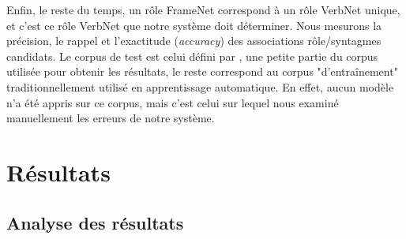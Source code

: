 Enfin, le reste du temps, un rôle FrameNet correspond à un rôle VerbNet unique,
et c'est ce rôle VerbNet que notre système doit déterminer. Nous mesurons la
précision, le rappel et l'exactitude (\textit{accuracy}) des associations
rôle/syntagmes candidats. Le corpus de test est celui défini par
\citep{das2011semi}, une petite partie du corpus utilisée pour obtenir les
résultats, le reste correspond au corpus "d'entraînement" traditionnellement
utilisé en apprentissage automatique. En effet, aucun modèle n'a été appris sur
ce corpus, mais c'est celui sur lequel nous examiné manuellement les erreurs de
notre système.

\section{Résultats}

\subsection{Analyse des résultats}
\label{resultats_srl}


